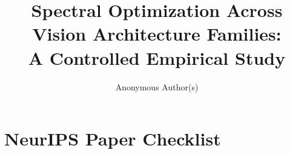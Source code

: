 \documentclass{article}
\title{Spectral Optimization Across Vision Architecture Families:\\A Controlled Empirical Study}
\author{
  Anonymous Author(s)
}
\begin{document}
\maketitle
























\section*{NeurIPS Paper Checklist}
\end{document}
